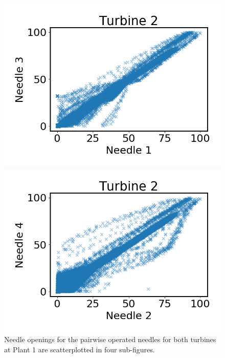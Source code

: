 \begin{figure}
\begin{minipage}[b]{0.5\linewidth}
                \includegraphics[width=\textwidth]{report/figures/data/t2_n1_n3.png}
            \end{minipage}
            \begin{minipage}[b]{0.5\linewidth}
                \centering
                \includegraphics[width=\textwidth]{report/figures/data/t2_n2_n4.png}
            \end{minipage}
            \caption{Needle openings for the pairwise operated needles for both turbines at Plant 1 are scatterplotted in four sub-figures.}
            \label{fig:plant1_needles}
        \end{figure}
        
